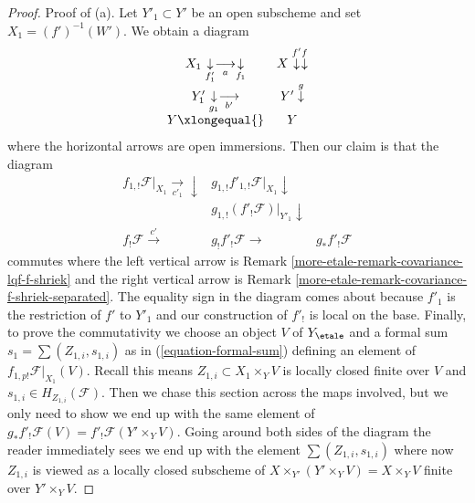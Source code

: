 \begin{proof}
\medskip\noindent
Proof of (a). Let $Y'_1 \subset Y'$ be an open subscheme
and set $X_1 = (f')^{-1}(W')$. We obtain a diagram
$$
\begin{array}{cc}X_1 \underset{f'_1}{\downarrow}\underset{a}{\longrightarrow}\underset{f_1}{\downarrow} & X \overset{f'}{\downarrow}\overset{f}{\downarrow} \\ Y'_1 \underset{g_1}{\downarrow}\underset{b'}{\longrightarrow} & Y' \overset{g}{\downarrow} \\ Y \xlongequal{} & Y\end{array}
$$
where the horizontal arrows are open immersions. Then our claim is that
the diagram
$$
\begin{array}{ccc}f_{1, !}\mathcal{F}|_{X_1} \underset{c'_1}{\longrightarrow}\downarrow & g_{1, !}f'_{1, !}\mathcal{F}|_{X_1} \downarrow &  \\  & g_{1, !}(f'_!\mathcal{F})|_{Y'_1} \downarrow &  \\ f_!\mathcal{F} \overset{c'}{\longrightarrow} & g_!f'_!\mathcal{F} \longrightarrow & g_*f'_!\mathcal{F}\end{array}
$$
commutes where the left vertical arrow is
Remark \ref{more-etale-remark-covariance-lqf-f-shriek} and
the right vertical arrow is Remark \ref{more-etale-remark-covariance-f-shriek-separated}.
The equality sign in the diagram comes about because $f'_1$
is the restriction of $f'$ to $Y'_1$ and our construction
of $f'_!$ is local on the base.
Finally, to prove the commutativity we choose an object $V$ of
$Y_\etale$ and a formal sum $s_1 = \sum (Z_{1, i}, s_{1, i})$ as in
(\ref{equation-formal-sum}) defining an element of
$f_{1, p!}\mathcal{F}|_{X_1}(V)$. Recall this means
$Z_{1, i} \subset X_1 \times_Y V$ is locally closed finite over $V$
and $s_{1, i} \in H_{Z_{1, i}}(\mathcal{F})$.
Then we chase this section
across the maps involved, but we only need to show we
end up with the same element of
$g_*f'_!\mathcal{F}(V) = f'_!\mathcal{F}(Y' \times_Y V)$.
Going around both sides of the diagram the reader immediately
sees we end up with the element $\sum (Z_{1, i}, s_{1, i})$
where now $Z_{1, i}$ is viewed as a locally closed subscheme
of $X \times_{Y'} (Y' \times_Y V) = X \times_Y V$ finite over
$Y' \times_Y V$.


\end{proof}
